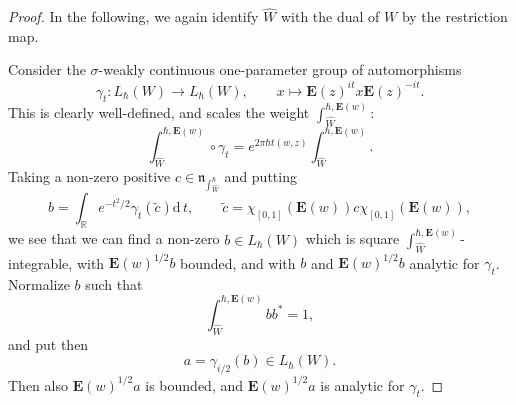 \documentclass[11pt, reqno]{amsart}
\theoremstyle{definition}
\numberwithin{equation}{section}
\def\R{\mathbb R}
\newcommand{\rd}{\mathrm{d}\!\,}
\newcommand{\Eb}{\mathbf{E}}
\newcommand{\mfn}{\mathfrak{n}}
\begin{document}
\begin{proof}
In the following, we again identify $\hat{W}$ with the dual of $W$ by the restriction map.

Consider the $\sigma$-weakly continuous one-parameter group of automorphisms 
\[
\gamma_t\colon  L_{\hbar}(W) \rightarrow L_{\hbar}(W),\qquad x \mapsto \Eb(z)^{it}x \Eb(z)^{-it}.
\]
This is clearly well-defined, and scales the weight $\int_{\hat{W}}^{\hbar,\Eb(w)}$:
\[
\int_{\hat{W}}^{\hbar,\Eb(w)} \circ \gamma_t = e^{2\pi\hbar t(w,z)}\int_{\hat{W}}^{\hbar,\Eb(w)}.
\]
Taking a non-zero positive $c \in \mfn_{\int_{\hat{W}}^{\hbar}}$ and putting 
\[
b = \int_{\R} e^{-t^2/2} \gamma_t (\widetilde{c})\rd t,\qquad \widetilde{c} = \chi_{[0,1]}(\Eb(w))c \chi_{[0,1]}(\Eb(w)),
\]
we see that we can find a non-zero $b \in L_{\hbar}(W)$ which is square $\int_{\hat{W}}^{\hbar,\Eb(w)}$-integrable, with $\Eb(w)^{1/2}b$ bounded, and with $b$ and  $\Eb(w)^{1/2}b$ analytic for $\gamma_t$. Normalize $b$ such that 
\begin{equation}\label{EqNormb}
\int_{\hat{W}}^{\hbar,\Eb(w)}bb^* =1,
\end{equation}
and put then 
\[
a = \gamma_{i/2}(b) \in L_{\hbar}(W).
\]
Then also $\Eb(w)^{1/2}a$ is bounded, and $\Eb(w)^{1/2}a$ is analytic for $\gamma_t$.


\end{proof}
\end{document}
